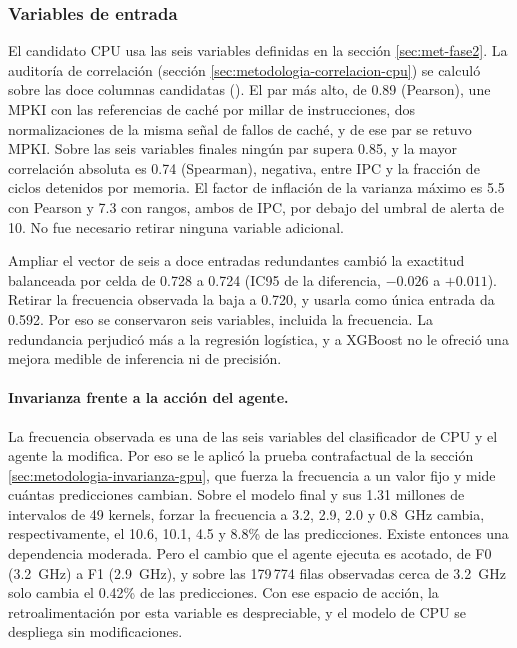 \subsubsection{Variables de entrada}
\label{sec:resultados-cpu-entradas}

El candidato CPU usa las seis variables definidas en la sección \ref{sec:met-fase2}. La auditoría de correlación (sección \ref{sec:metodologia-correlacion-cpu}) se calculó sobre las doce columnas candidatas (). El par más alto, de 0.89 (Pearson), une MPKI con las referencias de caché por millar de instrucciones, dos normalizaciones de la misma señal de fallos de caché, y de ese par se retuvo MPKI. Sobre las seis variables finales ningún par supera 0.85, y la mayor correlación absoluta es 0.74 (Spearman), negativa, entre IPC y la fracción de ciclos detenidos por memoria. El factor de inflación de la varianza máximo es 5.5 con Pearson y 7.3 con rangos, ambos de IPC, por debajo del umbral de alerta de 10. No fue necesario retirar ninguna variable adicional.

Ampliar el vector de seis a doce entradas redundantes cambió la exactitud balanceada por celda de 0.728 a 0.724 (IC95 de la diferencia, $-0.026$ a $+0.011$). Retirar la frecuencia observada la baja a 0.720, y usarla como única entrada da 0.592. Por eso se conservaron seis variables, incluida la frecuencia. La redundancia perjudicó más a la regresión logística, y a XGBoost no le ofreció una mejora medible de inferencia ni de precisión.


\paragraph{Invarianza frente a la acción del agente.}\label{sec:resultados-cpu-frecuencia-contrafactual} La frecuencia observada es una de las seis variables del clasificador de CPU y el agente la modifica. Por eso se le aplicó la prueba contrafactual de la sección \ref{sec:metodologia-invarianza-gpu}, que fuerza la frecuencia a un valor fijo y mide cuántas predicciones cambian. Sobre el modelo final y sus 1.31 millones de intervalos de 49 kernels, forzar la frecuencia a 3.2, 2.9, 2.0 y 0.8~GHz cambia, respectivamente, el 10.6, 10.1, 4.5 y 8.8\% de las predicciones. Existe entonces una dependencia moderada. Pero el cambio que el agente ejecuta es acotado, de F0 (3.2~GHz) a F1 (2.9~GHz), y sobre las 179\,774 filas observadas cerca de 3.2~GHz solo cambia el 0.42\% de las predicciones. Con ese espacio de acción, la retroalimentación por esta variable es despreciable, y el modelo de CPU se despliega sin modificaciones.

